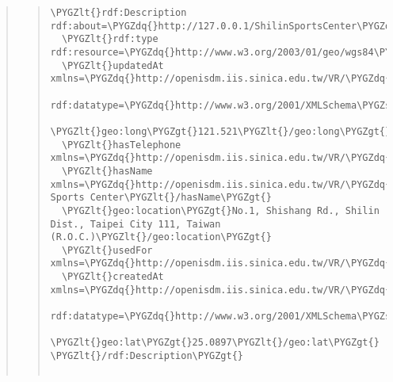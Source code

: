 \documentclass[letterpaper,10pt,english]{sphinxmanual}
\def\PYGZus{\char`\_}
\def\PYGZlt{\char`\<}
\def\PYGZgt{\char`\>}
\def\PYGZsh{\char`\#}
\def\PYGZhy{\char`\-}
\def\PYGZdq{\char`\"}
\begin{document}
\begin{quote}
\begin{description}
\begin{quote}
\begin{Verbatim}[commandchars=\\\{\}]
\PYGZlt{}rdf:Description rdf:about=\PYGZdq{}http://127.0.0.1/ShilinSportsCenter\PYGZdq{}\PYGZgt{}
  \PYGZlt{}rdf:type rdf:resource=\PYGZdq{}http://www.w3.org/2003/01/geo/wgs84\PYGZus{}pos\PYGZsh{}SpatialThing\PYGZdq{}/\PYGZgt{}
  \PYGZlt{}updatedAt xmlns=\PYGZdq{}http://openisdm.iis.sinica.edu.tw/VR/\PYGZdq{}
      rdf:datatype=\PYGZdq{}http://www.w3.org/2001/XMLSchema\PYGZsh{}dateTime\PYGZdq{}\PYGZgt{}2013\PYGZhy{}07\PYGZhy{}31T03:23:47Z\PYGZlt{}/updatedAt\PYGZgt{}
  \PYGZlt{}geo:long\PYGZgt{}121.521\PYGZlt{}/geo:long\PYGZgt{}
  \PYGZlt{}hasTelephone xmlns=\PYGZdq{}http://openisdm.iis.sinica.edu.tw/VR/\PYGZdq{}\PYGZgt{}2880\PYGZhy{}6066\PYGZlt{}/hasTelephone\PYGZgt{}
  \PYGZlt{}hasName xmlns=\PYGZdq{}http://openisdm.iis.sinica.edu.tw/VR/\PYGZdq{}\PYGZgt{}Shilin Sports Center\PYGZlt{}/hasName\PYGZgt{}
  \PYGZlt{}geo:location\PYGZgt{}No.1, Shishang Rd., Shilin Dist., Taipei City 111, Taiwan (R.O.C.)\PYGZlt{}/geo:location\PYGZgt{}
  \PYGZlt{}usedFor xmlns=\PYGZdq{}http://openisdm.iis.sinica.edu.tw/VR/\PYGZdq{}\PYGZgt{}Sport\PYGZlt{}/usedFor\PYGZgt{}
  \PYGZlt{}createdAt xmlns=\PYGZdq{}http://openisdm.iis.sinica.edu.tw/VR/\PYGZdq{}
      rdf:datatype=\PYGZdq{}http://www.w3.org/2001/XMLSchema\PYGZsh{}dateTime\PYGZdq{}\PYGZgt{}2012\PYGZhy{}11\PYGZhy{}28T09:05:13Z\PYGZlt{}/createdAt\PYGZgt{}
  \PYGZlt{}geo:lat\PYGZgt{}25.0897\PYGZlt{}/geo:lat\PYGZgt{}
\PYGZlt{}/rdf:Description\PYGZgt{}


\end{Verbatim}
\end{quote}
\end{description}
\end{quote}
\end{document}
